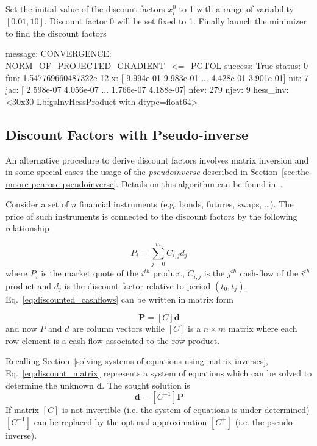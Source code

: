 Set the initial value of the discount factors $x_i^0$ to 1 with a range of variability $[0.01, 10]$. Discount factor 0 will be set fixed to 1.
Finally launch the minimizer to find the discount factors


\begin{ioutput}
  message: CONVERGENCE: NORM_OF_PROJECTED_GRADIENT_<=_PGTOL
  success: True
   status: 0
      fun: 1.547769660487322e-12
        x: [ 9.994e-01  9.983e-01 ...  4.428e-01  3.901e-01]
      nit: 7
      jac: [ 2.598e-07  4.056e-07 ...  1.766e-07  4.188e-07]
     nfev: 279
     njev: 9
 hess_inv: <30x30 LbfgsInvHessProduct with dtype=float64>
 \end{ioutput}

\subsection{Discount Factors with Pseudo-inverse}
An alternative procedure to derive discount factors involves matrix inversion and in some special cases the usage of the \emph{pseudoinverse} described in Section~\ref{sec:the-moore-penrose-pseudoinverse}. Details on this algorithm can be found in~\cite{bib:boostrap_pseudoinv}.

Consider a set of $n$ financial instruments (e.g. bonds, futures, swaps, \ldots). The price of such instruments is connected to the discount factors by the following relationship

\begin{equation}
P_i = \sum_{j=0}^{m} C_{i,j} d_j
\label{eq:discounted_cashflows}
\end{equation}
where $P_i$ is the market quote of the $i^{th}$ product, $C_{i,j}$ is the $j^{th}$ cash-flow of the $i^{th}$ product and $d_j$ is the discount factor relative to period $(t_0, t_j)$.
Eq.~\ref{eq:discounted_cashflows} can be written in matrix form

\begin{equation}
\boldsymbol{P} = [C]\boldsymbol{d}
\label{eq:discount_matrix}
\end{equation}
and now $P$ and $d$ are column vectors while $[C]$ is a $n \times m$ matrix where each row element is a cash-flow associated to the row product.

Recalling Section~\ref{solving-systems-of-equations-using-matrix-inverses}, Eq.~\ref{eq:discount_matrix} represents a system of equations which can be solved to determine the unknown $\boldsymbol{d}$.
The sought solution is
\begin{equation}
\boldsymbol{d} = [C^{-1}] \boldsymbol{P}
\end{equation}
If matrix $[C]$ is not invertible (i.e. the system of equations is under-determined) $[C^{-1}]$ can be replaced by the optimal approximation $[C^+]$ (i.e. the pseudo-inverse).

